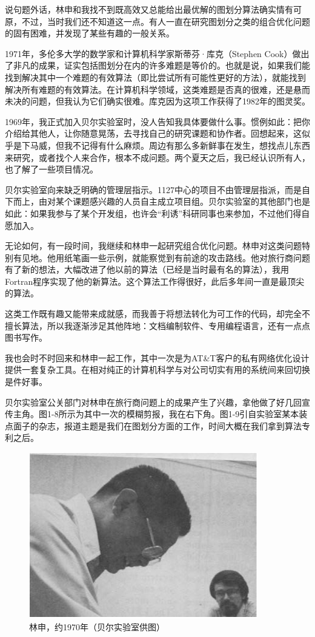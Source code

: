 \documentclass[a4paper,12pt,UTF8,twoside]{ctexbook}
\begin{document}
说句题外话，林申和我找不到既高效又总能给出最优解的图划分算法确实情有可原，不过，当时我们还不知道这一点。有人一直在研究图划分之类的组合优化问题的固有困难，并发现了某些有趣的一般关系。

1971年，多伦多大学的数学家和计算机科学家斯蒂芬·库克（Stephen Cook）做出了非凡的成果，证实包括图划分在内的许多难题是等价的。也就是说，如果我们能找到解决其中一个难题的有效算法（即比尝试所有可能性更好的方法），就能找到解决所有难题的有效算法。在计算机科学领域，这类难题是否真的很难，还是悬而未决的问题，但我认为它们确实很难。库克因为这项工作获得了1982年的图灵奖。

1969年，我正式加入贝尔实验室时，没人告知我具体要做什么事。惯例如此：把你介绍给其他人，让你随意晃荡，去寻找自己的研究课题和协作者。回想起来，这似乎是下马威，但我不记得有什么麻烦。周边有那么多新鲜事在发生，想找点儿东西来研究，或者找个人来合作，根本不成问题。两个夏天之后，我已经认识所有人，也了解了一些项目情况。

贝尔实验室向来缺乏明确的管理层指示。1127中心的项目不由管理层指派，而是自下而上，由对某个课题感兴趣的人员自主成立项目组。贝尔实验室的其他部门也是如此：如果我参与了某个开发组，也许会“利诱”科研同事也来参加，不过他们得自愿加入。

无论如何，有一段时间，我继续和林申一起研究组合优化问题。林申对这类问题特别有见地。他用纸笔画一些示例，就能察觉到有前途的攻击路线。他对旅行商问题有了新的想法，大幅改进了他以前的算法（已经是当时最有名的算法），我用Fortran程序实现了他的新算法。这个算法工作得很好，此后多年间一直是最顶尖的算法。

这类工作既有趣又能带来成就感，而我善于将想法转化为可工作的代码，却完全不擅长算法，所以我逐渐涉足其他阵地：文档编制软件、专用编程语言，还有一点点图书写作。

我也会时不时回来和林申一起工作，其中一次是为AT\&T客户的私有网络优化设计提供一套复杂工具。在相对纯正的计算机科学与对公司切实有用的系统间来回切换是件好事。

贝尔实验室公关部门对林申在旅行商问题上的成果产生了兴趣，拿他做了好几回宣传主角。图1-8所示为其中一次的模糊剪报，我在右下角。图1-9引自实验室某本装点面子的杂志，报道主题是我们在图划分方面的工作，时间大概在我们拿到算法专利之后。

\begin{figure}[htbp]
	\centering
	\includegraphics[width=0.7\linewidth]{8}
	\caption{林申，约1970年（贝尔实验室供图）}
	\label{fig:1}
\end{figure}
\end{document}
